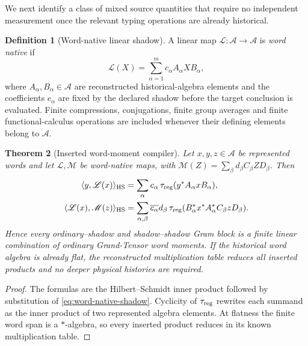 \documentclass[11pt]{article}
\newtheorem{theorem}{Theorem}[section]
\theoremstyle{definition}
\newtheorem{definition}[theorem]{Definition}
\theoremstyle{remark}
\newcommand{\HS}{\mathrm{HS}}
\newcommand{\A}{\mathcal A}
\begin{document}
We next identify a class of mixed source quantities that require no independent
measurement once the relevant typing operations are already historical.

\begin{definition}[Word-native linear shadow]
\label{def:word-native-shadow}
A linear map $\mathscr L:\A\to\A$ is \emph{word native} if
\begin{equation}
 \boxed{\mathscr L(X)=\sum_{\alpha=1}^m c_\alpha A_\alpha X B_\alpha,}
 \label{eq:word-native-shadow}
\end{equation}
where $A_\alpha,B_\alpha\in\A$ are reconstructed historical-algebra elements
and the coefficients $c_\alpha$ are fixed by the declared shadow before the
target conclusion is evaluated.  Finite compressions, conjugations, finite
group averages and finite functional-calculus operations are included whenever
their defining elements belong to $\A$.
\end{definition}

\begin{theorem}[Inserted word-moment compiler]
\label{thm:inserted-word-moments}
Let $x,y,z\in\A$ be represented words and let $\mathscr L,\mathscr M$ be
word-native maps, with
$\mathscr M(Z)=\sum_\beta d_\beta C_\beta ZD_\beta$.  Then
\begin{align}
 \langle y,\mathscr L(x)\rangle_{\HS}
 &=\sum_\alpha c_\alpha\,
   \tau_{\rm reg}(y^*A_\alpha xB_\alpha),
 \label{eq:inserted-one-moment}\\
 \langle\mathscr L(x),\mathscr M(z)\rangle_{\HS}
 &=\sum_{\alpha,\beta}\overline{c_\alpha}d_\beta\,
   \tau_{\rm reg}(B_\alpha^*x^*A_\alpha^*C_\beta zD_\beta).
 \label{eq:inserted-two-moments}
\end{align}
Hence every ordinary--shadow and shadow--shadow Gram block is a finite linear
combination of ordinary Grand-Tensor word moments.  If the historical word
algebra is already flat, the reconstructed multiplication table reduces all
inserted products and no deeper physical histories are required.
\end{theorem}

\begin{proof}
The formulas are the Hilbert--Schmidt inner product followed by substitution of
\eqref{eq:word-native-shadow}.  Cyclicity of $\tau_{\rm reg}$ rewrites each
summand as the inner product of two represented algebra elements.  At flatness
the finite word span is a $*$-algebra, so every inserted product reduces in its
known multiplication table.
\end{proof}
\end{document}
